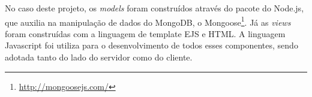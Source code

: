 No caso deste projeto, os \emph{models} foram construídos através do pacote do Node.js, que auxilia
na manipulação de dados do MongoDB, o Mongoose\footnote{\url{http://mongoosejs.com/}}. Já as \emph{views}
foram construídas com a linguagem de template EJS e HTML. A linguagem Javascript foi utiliza para o desenvolvimento de todos esses componentes, sendo adotada tanto do lado do servidor como do cliente.
